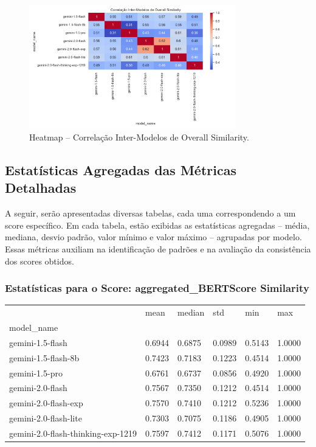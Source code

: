 \documentclass{article}%
\begin{document}
\begin{figure}[H]%
\centering%
\includegraphics[width=0.8\textwidth]{analysis_results/heatmap_inter_model_corr.png}%
\caption{Heatmap – Correlação Inter{-}Modelos de Overall Similarity.}%
\end{figure}

%
\subsection*{Estatísticas Agregadas das Métricas Detalhadas}%
\label{subsec:EstatsticasAgregadasdasMtricasDetalhadas}%
A seguir, serão apresentadas diversas tabelas, cada uma correspondendo a um score específico. Em cada tabela, estão exibidas as estatísticas agregadas – média, mediana, desvio padrão, valor mínimo e valor máximo – agrupadas por modelo. Essas métricas auxiliam na identificação de padrões e na avaliação da consistência dos scores obtidos.%
\subsubsection*{Estatísticas para o Score: aggregated\_BERTScore Similarity}%
\begin{table}[H]%
\centering%
\begin{tabular}{llllll}
\toprule
 & mean & median & std & min & max \\
model_name &  &  &  &  &  \\
\midrule
gemini-1.5-flash & 0.6944 & 0.6875 & 0.0989 & 0.5143 & 1.0000 \\
gemini-1.5-flash-8b & 0.7423 & 0.7183 & 0.1223 & 0.4514 & 1.0000 \\
gemini-1.5-pro & 0.6761 & 0.6737 & 0.0856 & 0.4920 & 1.0000 \\
gemini-2.0-flash & 0.7567 & 0.7350 & 0.1212 & 0.4514 & 1.0000 \\
gemini-2.0-flash-exp & 0.7570 & 0.7410 & 0.1212 & 0.5236 & 1.0000 \\
gemini-2.0-flash-lite & 0.7303 & 0.7075 & 0.1186 & 0.4905 & 1.0000 \\
gemini-2.0-flash-thinking-exp-1219 & 0.7597 & 0.7412 & 0.1171 & 0.5076 & 1.0000 \\
\bottomrule
\end{tabular}
%
\end{table}%
\vspace{0.5cm}%
\end{document}
